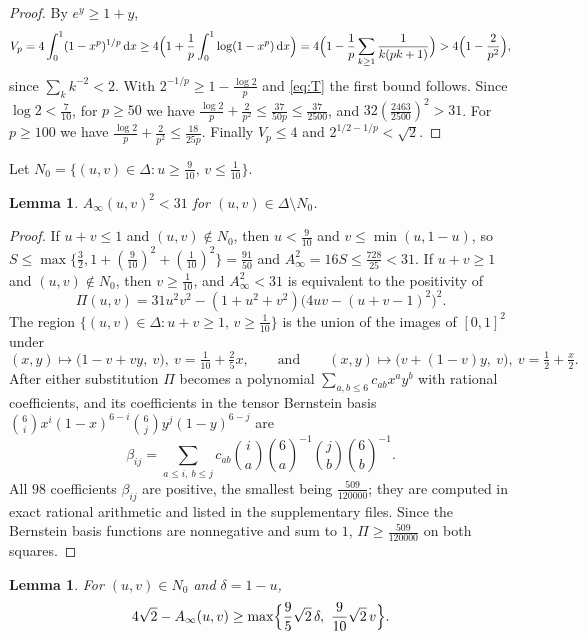 \documentclass[11pt]{amsart}
\newtheorem{lemma}[theorem]{Lemma}
\theoremstyle{definition}
\theoremstyle{remark}
\numberwithin{equation}{section}
\newcommand{\dd}{\,\mathrm{d}}
\begin{document}
\begin{proof}
By $e^y\ge1+y$,
\[
V_p=4\int_0^1(1-x^p)^{1/p}\dd x\ge4\Bigl(1+\frac1p\int_0^1\log(1-x^p)\dd x\Bigr)=4\Bigl(1-\frac1p\sum_{k\ge1}\frac1{k(pk+1)}\Bigr)>4\Bigl(1-\frac2{p^2}\Bigr),
\]
since $\sum_kk^{-2}<2$. With $2^{-1/p}\ge1-\frac{\log2}p$ and \eqref{eq:T} the first bound follows. Since $\log2<\frac7{10}$, for $p\ge50$ we have $\frac{\log 2}p+\frac2{p^2}\le\frac{37}{50p}\le\frac{37}{2500}$, and $32(\frac{2463}{2500})^2>31$. For $p\ge100$ we have $\frac{\log 2}p+\frac2{p^2}\le\frac{18}{25p}$. Finally $V_p\le4$ and $2^{1/2-1/p}<\sqrt2$.
\end{proof}

Let $N_0=\{(u,v)\in\Delta:u\ge\frac9{10},\,v\le\frac1{10}\}$.

\begin{lemma}\label{lem:bernstein}
$A_\infty(u,v)^2<31$ for $(u,v)\in\Delta\setminus N_0$.
\end{lemma}

\begin{proof}
If $u+v\le1$ and $(u,v)\notin N_0$, then $u<\frac9{10}$ and $v\le\min(u,1-u)$, so $S\le\max\{\frac32,1+(\frac9{10})^2+(\frac1{10})^2\}=\frac{91}{50}$ and $A_\infty^2=16S\le\frac{728}{25}<31$. If $u+v\ge1$ and $(u,v)\notin N_0$, then $v\ge\frac1{10}$, and $A_\infty^2<31$ is equivalent to the positivity of
\[
\Pi(u,v)=31u^2v^2-(1+u^2+v^2)\bigl(4uv-(u+v-1)^2\bigr)^2 .
\]
The region $\{(u,v)\in\Delta:u+v\ge1,\,v\ge\frac1{10}\}$ is the union of the images of $[0,1]^2$ under
\[
(x,y)\mapsto\bigl(1-v+vy,\ v\bigr),\ v=\tfrac1{10}+\tfrac25x,\qquad\text{and}\qquad (x,y)\mapsto\bigl(v+(1-v)y,\ v\bigr),\ v=\tfrac12+\tfrac x2 .
\]
After either substitution $\Pi$ becomes a polynomial $\sum_{a,b\le6}c_{ab}x^ay^b$ with rational coefficients, and its coefficients in the tensor Bernstein basis $\binom6ix^i(1-x)^{6-i}\binom6jy^j(1-y)^{6-j}$ are
\[
\beta_{ij}=\sum_{a\le i,\ b\le j}c_{ab}\binom ia\binom6a^{-1}\binom jb\binom6b^{-1}.
\]
All $98$ coefficients $\beta_{ij}$ are positive, the smallest being $\frac{509}{120000}$; they are computed in exact rational arithmetic and listed in the supplementary files. Since the Bernstein basis functions are nonnegative and sum to $1$, $\Pi\ge\frac{509}{120000}$ on both squares.
\end{proof}

\begin{lemma}\label{lem:cubemargin}
For $(u,v)\in N_0$ and $\delta=1-u$,
\[
4\sqrt2-A_\infty(u,v)\ge\max\Bigl\{\frac95\sqrt2\,\delta,\ \frac9{10}\sqrt2\,v\Bigr\}.
\]
\end{lemma}
\end{document}
